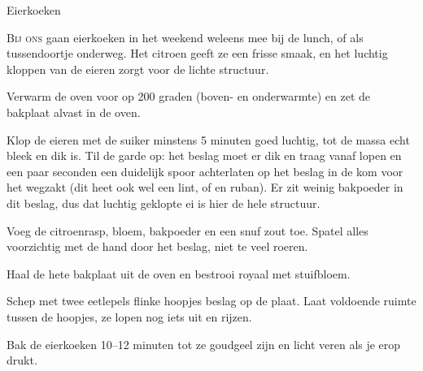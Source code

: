 \begin{recipe}{Eierkoeken}


\lettrine{B}{ij ons} gaan eierkoeken in het weekend weleens mee bij de lunch,
of als tussendoortje onderweg. Het citroen geeft ze een frisse smaak, en het
luchtig kloppen van de eieren zorgt voor de lichte structuur.

\begin{ingredients}
\end{ingredients}

\begin{steps}
  \item Verwarm de oven voor op 200 graden (boven- en onderwarmte) en zet de bakplaat alvast in de oven.
  \item Klop de eieren met de suiker minstens 5 minuten goed luchtig, tot de massa
        echt bleek en dik is. Til de garde op: het beslag moet er dik en traag
        vanaf lopen en een paar seconden een duidelijk spoor achterlaten op het
        beslag in de kom voor het wegzakt (dit heet ook wel een lint, of en
        ruban). Er zit weinig bakpoeder in dit beslag, dus dat
        luchtig geklopte ei is hier de hele structuur.
  \item Voeg de citroenrasp, bloem, bakpoeder en een snuf zout toe. Spatel alles voorzichtig
        met de hand door het beslag, niet te veel roeren.
  \item Haal de hete bakplaat uit de oven en bestrooi royaal met stuifbloem.
  \item Schep met twee eetlepels flinke hoopjes beslag op de plaat. Laat voldoende ruimte
        tussen de hoopjes, ze lopen nog iets uit en rijzen.
  \item Bak de eierkoeken 10--12 minuten tot ze goudgeel zijn en licht veren als je erop drukt.
\end{steps}
\end{recipe}
